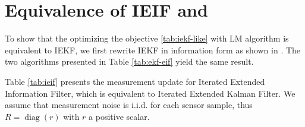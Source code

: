 \section{Equivalence of IEIF and }
\label{app:ieif-lm}

To show that the optimizing the objective  \ref{tab:iekf-like} with LM algorithm is equivalent to IEKF, we first rewrite IEKF in information form as shown in \cite{anderson1979optimal}. The two algorithms presented in Table \ref{tab:ekf-eif} yield the same result.

\begin{table}[!h] 
\centering
\caption{EKF vs EIF measurement update \label{tab:ekf-eif}} 
\end{table}

Table \ref{tab:ieif} presents the measurement update for Iterated Extended Information Filter, which is equivalent to Iterated Extended Kalman Filter. We assume that measurement noise is i.i.d. for each sensor sample, thus $R = \operatorname{diag}(r)$ with $r$ a positive scalar.

